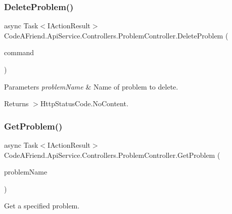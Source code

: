 \subsubsection{\texorpdfstring{Delete\+Problem()}{DeleteProblem()}}
{\footnotesize\ttfamily async Task$<$I\+Action\+Result$>$ Code\+A\+Friend.\+Api\+Service.\+Controllers.\+Problem\+Controller.\+Delete\+Problem (\begin{DoxyParamCaption}\item[{\mbox{\hyperlink{class_code_a_friend_1_1_data_model_1_1_user_1_1_delete_problem_command}{User.\+Delete\+Problem\+Command}}}]{command }\end{DoxyParamCaption})}






\begin{DoxyParams}{Parameters}
{\em problem\+Name} & Name of problem to delete.\\
\hline
\end{DoxyParams}
\begin{DoxyReturn}{Returns}
$>$Http\+Status\+Code.\+No\+Content.
\end{DoxyReturn}
\mbox{\label{class_code_a_friend_1_1_api_service_1_1_controllers_1_1_problem_controller_a27d7c0de93899d3c5a702ee508e909e8}} 
\subsubsection{\texorpdfstring{Get\+Problem()}{GetProblem()}}
{\footnotesize\ttfamily async Task$<$I\+Action\+Result$>$ Code\+A\+Friend.\+Api\+Service.\+Controllers.\+Problem\+Controller.\+Get\+Problem (\begin{DoxyParamCaption}\item[{string}]{problem\+Name }\end{DoxyParamCaption})}



Get a specified problem. 


